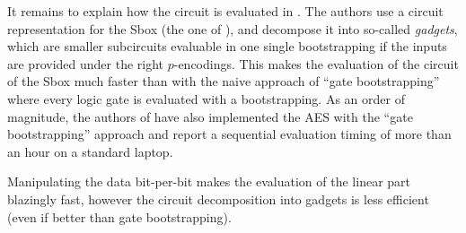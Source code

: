 It remains to explain how the \SubBytes circuit is evaluated in \cite{TCHES:BonPoiRiv24}. The authors use a circuit representation for the Sbox (the one of \cite{boyar}), and decompose it into so-called \textit{gadgets}, which are smaller subcircuits evaluable in one single bootstrapping if the inputs are provided under the right $p$-encodings. This makes the evaluation of the circuit of the Sbox much faster than with the naive approach of ``gate bootstrapping'' %
where every logic gate is evaluated with a bootstrapping. As an order of magnitude, the authors of \cite{ISC:WWLLL23} have also implemented the AES with the ``gate bootstrapping'' approach and report a sequential evaluation timing of more than an hour on a standard laptop.


Manipulating the data bit-per-bit makes the evaluation of the linear part blazingly fast, however the circuit decomposition into gadgets is less efficient (even if better than gate bootstrapping).

